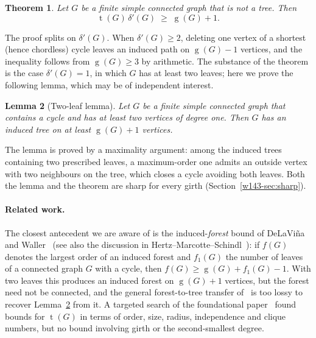 \documentclass[11pt]{article}
\numberwithin{equation}{section}
\newtheorem{theorem}{Theorem}[section]
\newtheorem{lemma}[theorem]{Lemma}
\theoremstyle{remark}
\newcommand{\tr}{\operatorname{t}}
\newcommand{\gr}{\operatorname{g}}
\newcommand{\dd}{\delta'}
\begin{document}
\begin{theorem}\label{w143-thm:main}
Let $G$ be a finite simple connected graph that is not a tree.  Then
\[
  \tr(G)\,\dd(G)\;\ge\;\gr(G)+1 .
\]
\end{theorem}

The proof splits on $\dd(G)$.  When $\dd(G)\ge2$, deleting one vertex of a
shortest (hence chordless) cycle leaves an induced path on $\gr(G)-1$ vertices,
and the inequality follows from $\gr(G)\ge3$ by arithmetic.  The substance of
the theorem is the case $\dd(G)=1$, in which $G$ has at least two leaves; here
we prove the following lemma, which may be of independent interest.

\begin{lemma}[Two-leaf lemma]\label{w143-lem:twoleaf-intro}
Let $G$ be a finite simple connected graph that contains a cycle and has at
least two vertices of degree one.  Then $G$ has an induced tree on at least
$\gr(G)+1$ vertices.
\end{lemma}

The lemma is proved by a maximality argument: among the induced trees
containing two prescribed leaves, a maximum-order one admits an outside vertex
with two neighbours on the tree, which closes a cycle avoiding both leaves.
Both the lemma and the theorem are sharp for every girth
(Section~\ref{w143-sec:sharp}).

\paragraph{Related work.}
The closest antecedent we are aware of is the induced-\emph{forest} bound of
DeLaVi\~na and Waller~\cite{DW04} (see also the discussion in
Hertz--Marcotte--Schindl~\cite{HMS14}): if $f(G)$ denotes the largest order of
an induced forest and $f_1(G)$ the number of leaves of a connected graph $G$
with a cycle, then $f(G)\ge\gr(G)+f_1(G)-1$.  With two leaves this produces an
induced forest on $\gr(G)+1$ vertices, but the forest need not be connected,
and the general forest-to-tree transfer of~\cite[Theorem~2.3]{HMS14} is too
lossy to recover Lemma~\ref{w143-lem:twoleaf-intro} from it.  A targeted search of
the foundational paper~\cite{ESS86} found bounds for $\tr(G)$ in terms of
order, size, radius, independence and clique numbers, but no bound involving
girth or the second-smallest degree.
\end{document}
